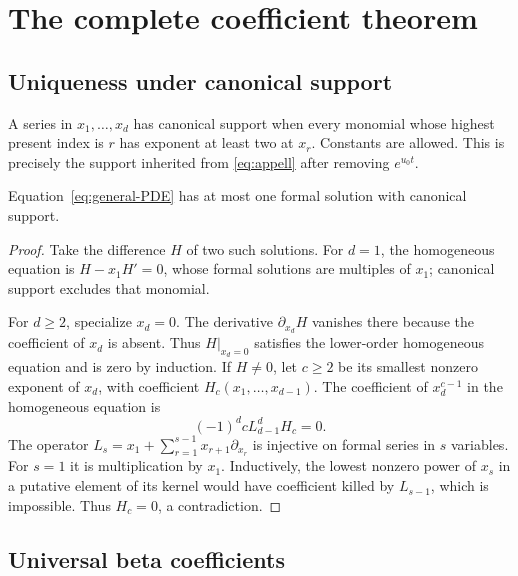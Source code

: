\section{The complete coefficient theorem}
\label{sec:universal}

\subsection{Uniqueness under canonical support}

A series in $x_1,\ldots,x_d$ has canonical support when every monomial whose highest present index is $r$ has exponent at least two at $x_r$. Constants are allowed. This is precisely the support inherited from \eqref{eq:appell} after removing $e^{u_0t}$.

\begin{lemma}\label{lem:unique}
Equation~\eqref{eq:general-PDE} has at most one formal solution with canonical support.
\end{lemma}
\begin{proof}
Take the difference $H$ of two such solutions. For $d=1$, the homogeneous equation is $H-x_1H'=0$, whose formal solutions are multiples of $x_1$; canonical support excludes that monomial.

For $d\ge2$, specialize $x_d=0$. The derivative $\partial_{x_d}H$ vanishes there because the coefficient of $x_d$ is absent. Thus $H|_{x_d=0}$ satisfies the lower-order homogeneous equation and is zero by induction. If $H\ne0$, let $c\ge2$ be its smallest nonzero exponent of $x_d$, with coefficient $H_c(x_1,\ldots,x_{d-1})$. The coefficient of $x_d^{c-1}$ in the homogeneous equation is
\[
 (-1)^d c L_{d-1}^d H_c=0.
\]
The operator $L_s=x_1+\sum_{r=1}^{s-1}x_{r+1}\partial_{x_r}$ is injective on formal series in $s$ variables. For $s=1$ it is multiplication by $x_1$. Inductively, the lowest nonzero power of $x_s$ in a putative element of its kernel would have coefficient killed by $L_{s-1}$, which is impossible. Thus $H_c=0$, a contradiction.
\end{proof}

\subsection{Universal beta coefficients}


